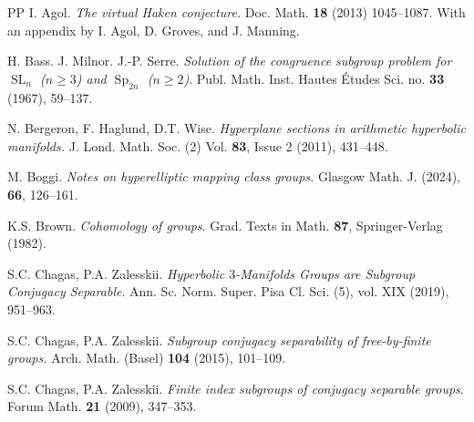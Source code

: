 \documentclass[12pt,twoside]{amsart}
\newcommand\SL{\operatorname{SL}}
\newcommand\Sp{\operatorname{Sp}}
\theoremstyle{definition}
\begin{document}
\begin{thebibliography}{PP}
 I. Agol. \textsl{The virtual Haken conjecture.} Doc. Math. \textbf{18} (2013) 1045--1087.  With an appendix by I. Agol,
D. Groves, and J. Manning.


H. Bass. J. Milnor. J.-P. Serre. \textsl{Solution of the congruence subgroup problem 
for $\SL_n$ ($n\geq 3$) and $\Sp_{2n}$ ($n\geq 2$)}.  Publ. Math. Inst. Hautes \'Etudes Sci. no. {\bf 33} (1967), 59--137. 

 N. Bergeron, F. Haglund, D.T. Wise. \textsl{Hyperplane sections in arithmetic hyperbolic manifolds.} 
J. Lond. Math. Soc. (2) Vol. {\bf 83}, Issue 2 (2011), 431--448.







 M. Boggi. \textsl{Notes on hyperelliptic mapping class groups.} Glasgow Math. J. (2024), {\bf 66}, 126--161.

K.S. Brown. \textsl{Cohomology of groups}. Grad. Texts in Math. {\bf 87}, Springer-Verlag (1982).

S.C. Chagas, P.A. Zalesskii. \textsl{Hyperbolic $3$-Manifolds Groups are Subgroup Conjugacy Separable}. 
Ann. Sc. Norm. Super. Pisa Cl. Sci. (5), vol. XIX (2019),  951--963.

S.C. Chagas, P.A. Zalesskii. \textsl{Subgroup conjugacy separability of free-by-finite groups.} Arch. Math. (Basel) {\bf 104} (2015), 101--109.

 S.C. Chagas, P.A. Zalesskii. \textsl{Finite index subgroups of conjugacy separable groups}. 
Forum Math. {\bf 21} (2009), 347--353.


\end{thebibliography}
\end{document}
